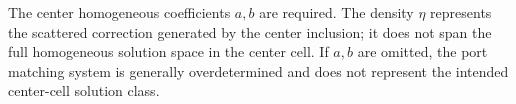 The center homogeneous coefficients \(a,b\) are required.  The density
\(\eta\) represents the scattered correction generated by the center inclusion;
it does not span the full homogeneous solution space in the center cell.  If
\(a,b\) are omitted, the port matching system is generally overdetermined and
does not represent the intended center-cell solution class.

